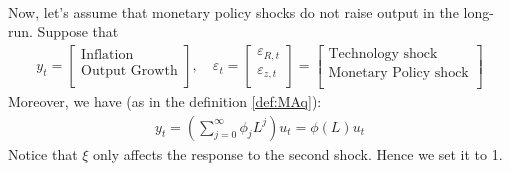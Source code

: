 \begin{eg}
    \

    Now, let's assume that monetary policy shocks do not raise output in the long-run.
    Suppose that
    \begin{gather*}
        y_t = \begin{bmatrix}
             \text{Inflation} \\
             \text{Output Growth} \\
        \end{bmatrix}, \quad
        \varepsilon_t = \begin{bmatrix}
             \varepsilon_{R,t} \\
             \varepsilon_{z,t} \\
        \end{bmatrix}
        = \begin{bmatrix}
             \text{Technology shock} \\ 
             \text{Monetary Policy shock} \\
        \end{bmatrix}
    \end{gather*}
    Moreover, we have (as in the definition \ref{def:MAq}): 
    \begin{gather*}
        y_t = \left(\sum_{j=0}^{\infty} \phi_j L^j\right) u_t = \phi(L) u_t
    \end{gather*}
    Notice that $\xi $ only affects the response to the second shock. Hence we set it to 1.


\end{eg}
